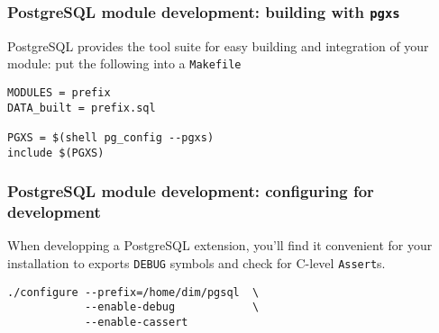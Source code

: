 \documentclass{beamer}
\begin{document}

\begin{frame}[fragile]
  \frametitle{PostgreSQL module development: building with \texttt{pgxs}}

  PostgreSQL provides the tool suite for easy building and integration of
  your module: put the following into a \texttt{Makefile}

  \begin{example}
  \begin{verbatim}
MODULES = prefix
DATA_built = prefix.sql

PGXS = $(shell pg_config --pgxs)
include $(PGXS)
  \end{verbatim}
  \end{example}
\end{frame}

\begin{frame}[fragile]
  \frametitle{PostgreSQL module development: configuring for development}

  When developping a PostgreSQL extension, you'll find it convenient for
  your installation to exports \texttt{DEBUG} symbols and check for C-level
  \texttt{Assert}s.

  \begin{example}
  \begin{verbatim}
./configure --prefix=/home/dim/pgsql  \
            --enable-debug            \
            --enable-cassert
  \end{verbatim}
  \end{example}
\end{frame}
\end{document}
